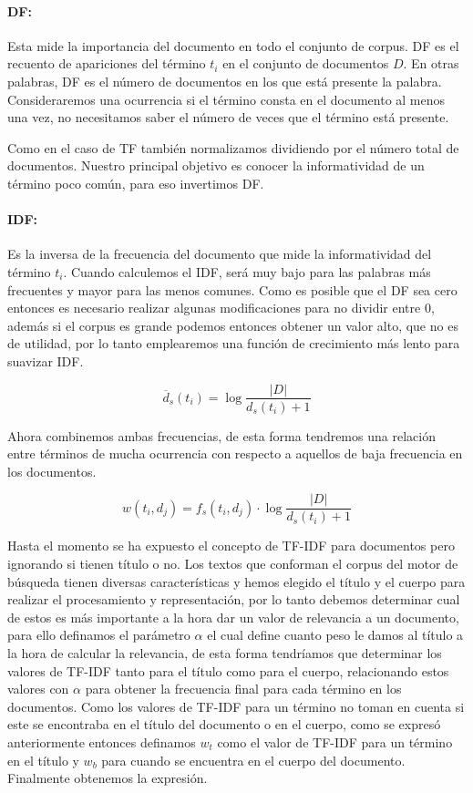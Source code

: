 \documentclass[runningheads,a4paper]{llncs}
\begin{document}
\paragraph*{DF:} Esta mide la importancia del documento en todo el conjunto de corpus. DF es el recuento de apariciones del término $t_i$ en el conjunto de documentos $D$. En otras palabras, DF es el número de documentos en los que está presente la palabra. Consideraremos una ocurrencia si el término consta en el documento al menos una vez, no necesitamos saber el número de veces que el término está presente. 

Como en el caso de TF también normalizamos dividiendo por el número total de documentos. Nuestro principal objetivo es conocer la informatividad de un término poco común, para eso invertimos DF.

\paragraph*{IDF:} Es la inversa de la frecuencia del documento que mide la informatividad del término $t_i$. Cuando calculemos el IDF, será muy bajo para las palabras más frecuentes y mayor para las menos comunes. Como es posible que el DF sea cero entonces es necesario realizar algunas modificaciones para no dividir entre 0, además si el corpus es grande podemos entonces obtener un valor alto, que no es de utilidad, por lo tanto emplearemos  una función de crecimiento más lento para suavizar IDF.

\begin{equation}
	\overline{d}_s(t_i) = \log{\frac{|D|}{d_s(t_i) + 1}}
\end{equation}

Ahora combinemos ambas frecuencias, de esta forma tendremos una relación entre términos de mucha ocurrencia con respecto a aquellos de baja frecuencia en los documentos.

\begin{equation}
	w(t_i, d_j) = f_s(t_i, d_j) \cdot \log{\frac{|D|}{d_s(t_i) + 1}}
\end{equation}

Hasta el momento se ha expuesto el concepto de TF-IDF para documentos pero ignorando si tienen título o no. Los textos que conforman el corpus del motor de búsqueda tienen diversas características y hemos elegido el título y el cuerpo para realizar el procesamiento y representación, por lo tanto debemos determinar cual de estos es más importante a la hora  dar un valor de relevancia a un documento, para ello definamos el parámetro $\alpha$ el cual define cuanto peso le damos al título a la hora de calcular la relevancia, de esta forma tendríamos que determinar los valores de TF-IDF tanto para el título como para el cuerpo, relacionando estos valores con $\alpha$ para obtener la frecuencia final para cada término en los documentos. Como los valores de TF-IDF para un término no toman en cuenta si este se encontraba en el título del documento o en el cuerpo, como se expresó anteriormente entonces definamos $w_t$ como el valor de TF-IDF para un término en el título y $w_b$ para cuando se encuentra en el cuerpo del documento. Finalmente obtenemos la expresión.
\end{document}
